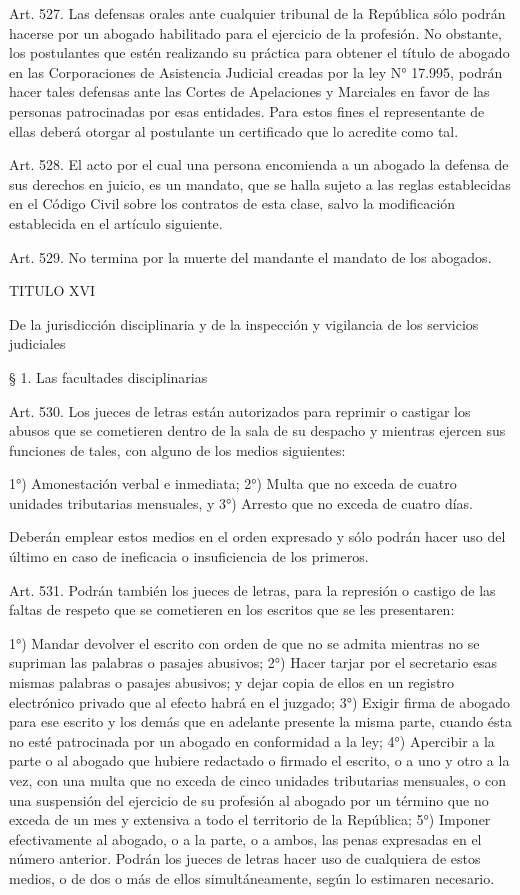     Art. 527. Las defensas orales ante cualquier tribunal de la República sólo podrán hacerse por un abogado habilitado para el ejercicio de la profesión. No obstante, los postulantes que estén realizando su práctica para obtener el título de abogado en las Corporaciones de Asistencia Judicial creadas por la ley N° 17.995, podrán hacer tales defensas ante las Cortes de Apelaciones y Marciales en favor de las personas patrocinadas por esas entidades. Para estos fines el representante de ellas deberá otorgar al postulante un certificado que lo acredite como tal.



    Art. 528. El acto por el cual una persona encomienda a un abogado la defensa de sus derechos en juicio, es un mandato, que se halla sujeto a las reglas establecidas en el Código Civil sobre los contratos de esta clase, salvo la modificación establecida en el artículo siguiente.

    Art. 529. No termina por la muerte del mandante el mandato de los abogados.

    TITULO XVI

    De la jurisdicción disciplinaria y de la inspección y vigilancia de los servicios judiciales


    § 1. Las facultades disciplinarias


    Art. 530. Los jueces de letras están autorizados para reprimir o castigar los abusos que se cometieren dentro de la sala de su despacho y mientras ejercen sus funciones de tales, con alguno de los medios siguientes:

    1°) Amonestación verbal e inmediata;
    2°) Multa que no exceda de cuatro unidades tributarias mensuales, y
    3°) Arresto que no exceda de cuatro días.

    Deberán emplear estos medios en el orden expresado y sólo podrán hacer uso del último en caso de ineficacia o insuficiencia de los primeros.


    Art. 531. Podrán también los jueces de letras, para la represión o castigo de las faltas de respeto que se cometieren en los escritos que se les presentaren:

    1°) Mandar devolver el escrito con orden de que no se admita mientras no se supriman las palabras o pasajes abusivos;
    2°) Hacer tarjar por el secretario esas mismas palabras o pasajes abusivos; y dejar copia de ellos en un registro electrónico privado que al efecto habrá en el juzgado;
    3°) Exigir firma de abogado para ese escrito y los demás que en adelante presente la misma parte, cuando ésta no esté patrocinada por un abogado en conformidad a la ley;
    4°) Apercibir a la parte o al abogado que hubiere redactado o firmado el escrito, o a uno y otro a la vez, con una multa que no exceda de cinco unidades tributarias mensuales, o con una suspensión del ejercicio de su profesión al abogado por un término que no exceda de un mes y extensiva a todo el territorio de la República;
    5°) Imponer efectivamente al abogado, o a la parte, o a ambos, las penas expresadas en el número anterior.
    Podrán los jueces de letras hacer uso de cualquiera de estos medios, o de dos o más de ellos simultáneamente, según lo estimaren necesario.



